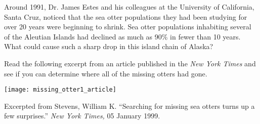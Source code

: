 \documentclass[12pt]{article}
\begin{document}
\thispagestyle{plain}

Around 1991, Dr. James Estes and his colleagues at the University of California, Santa Cruz, noticed that the sea otter populations they had been studying for over 20 years were beginning to shrink. Sea otter populations inhabiting several of the Aleutian Islands had declined as much as 90\% in fewer than 10 years. What could cause such a sharp drop in this island chain of Alaska?

Read the following excerpt from an article published in the \textit{New York Times} and see if you can determine where all of the missing otters had gone.

\begin{center}
	\texttt{[image: missing\_otter1\_article]}
\end{center}

{\small Excerpted from Stevens, William K. ``Searching for missing sea otters turns up a few surprises.'' \textit{New York Times,} 05 January 1999.}
\end{document}

